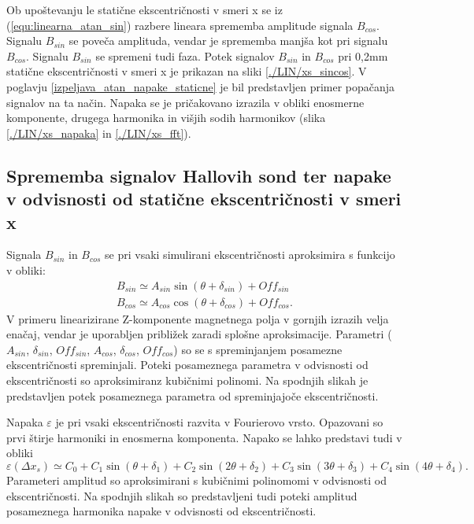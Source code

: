 Ob upoštevanju le statične ekscentričnosti v smeri x se iz (\ref{equ:linearna_atan_sin}) razbere lineara sprememba amplitude signala $B_{cos}$.
Signalu $B_{sin}$ se poveča amplituda, vendar je sprememba manjša kot pri signalu $B_{cos}$. Signalu $B_{sin}$ se spremeni tudi faza.
Potek signalov $B_{sin}$ in $B_{cos}$ pri 0,2mm statične ekscentričnosti v smeri x je prikazan na sliki \ref{./LIN/xs_sincos}.
V poglavju \ref{izpeljava_atan_napake_staticne} je bil predstavljen primer popačanja signalov na ta način.
Napaka se je pričakovano izrazila v obliki enosmerne komponente, drugega harmonika in višjih sodih harmonikov (slika \ref{./LIN/xs_napaka} in \ref{./LIN/xs_fft}).
\subsection{Sprememba signalov Hallovih sond ter napake v odvisnosti od statične ekscentričnosti v smeri x}
Signala $B_{sin}$ in $B_{cos}$ se pri vsaki simulirani ekscentričnosti aproksimira s funkcijo v obliki:
\begin{eqnarray}
B_{sin} \simeq A_{sin} \sin (\theta + \delta_{sin})+ Off_{sin}\\
B_{cos} \simeq A_{cos} \cos (\theta + \delta_{cos})+ Off_{cos}.
\end{eqnarray}
V primeru linearizirane Z-komponente magnetnega polja v gornjih izrazih velja enačaj, vendar je uporabljen približek zaradi splošne aproksimacije. Parametri ($A_{sin}$, $\delta_{sin}$, $Off_{sin}$, $A_{cos}$, $\delta_{cos}$, $Off_{cos}$) so se s spreminjanjem posamezne ekscentričnosti spreminjali. Poteki posameznega parametra v odvisnosti od ekscentričnosti so aproksimiranz kubičnimi polinomi.
Na spodnjih slikah je predstavljen potek posameznega parametra od spreminjajoče ekscentričnosti.

Napaka $\varepsilon$ je pri vsaki ekscentričnosti razvita v Fourierovo vrsto. Opazovani so prvi štirje harmoniki in enosmerna komponenta. Napako se lahko predstavi tudi v obliki
\begin{equation}
\varepsilon (\Delta x_s) \simeq C_0 + C_1 \sin (\theta + \delta_1)
+ C_2 \sin (2 \theta + \delta_2)
+ C_3 \sin (3 \theta + \delta_3)
+ C_4 \sin (4 \theta + \delta_4).
\end{equation}
Parameteri amplitud so  aproksimirani s kubičnimi polinomomi v odvisnosti od ekscentričnosti.
Na spodnjih slikah so predstavljeni tudi poteki amplitud posameznega harmonika napake v odvisnosti od ekscentričnosti.

